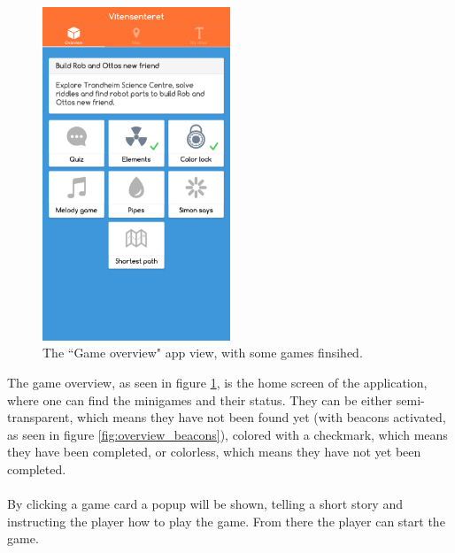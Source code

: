 \begin{figure}[H]
    \centering
    \includegraphics[width=0.5\textwidth]{images/app/overview_finished.png}
    \caption{The ``Game overview" app view, with some games finsihed.}
    \label{fig:overview_finished}
\end{figure}

The game overview, as seen in figure \ref{fig:overview_finished}, is the home screen of the application, where one can find the minigames and their status. They can be either semi-transparent, which means they have not been found yet (with beacons activated, as seen in figure \ref{fig:overview_beacons}), colored with a checkmark, which means they have been completed, or colorless, which means they have not yet been completed.\\\\
By clicking a game card a popup will be shown, telling a short story and instructing the player how to play the game. From there the player can start the game.


